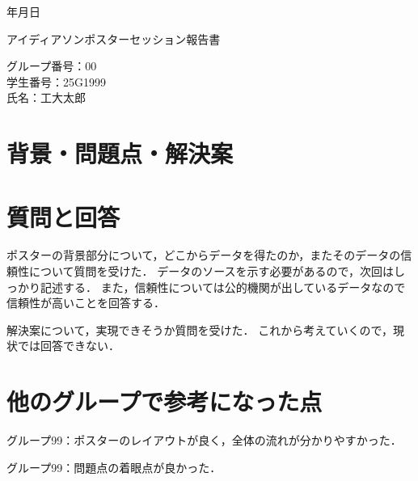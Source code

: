 \documentclass[uplatex]{jsarticle}
\begin{document}
\begin{flushright}
    \number\year 年\number\month 月\number\day 日
\end{flushright}

\begin{center}
    {\LARGE アイディアソンポスターセッション報告書}
\end{center}

\begin{flushright}
    グループ番号：00\\
    学生番号：25G1999\\
    氏名：工大太郎
\end{flushright}


\section{背景・問題点・解決案}


\section{質問と回答}
ポスターの背景部分について，どこからデータを得たのか，またそのデータの信頼性について質問を受けた．
データのソースを示す必要があるので，次回はしっかり記述する．
また，信頼性については公的機関が出しているデータなので信頼性が高いことを回答する．

解決案について，実現できそうか質問を受けた．
これから考えていくので，現状では回答できない．

\section{他のグループで参考になった点}
グループ99：ポスターのレイアウトが良く，全体の流れが分かりやすかった．

グループ99：問題点の着眼点が良かった．
\end{document}

